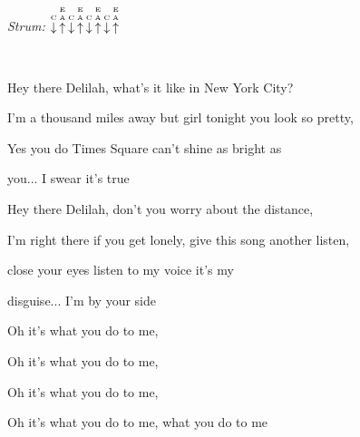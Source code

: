\begin{song}


 \quad
\textit{Strum:} $\PluckDown{C}\PluckUp{E A}\PluckDown{C}\PluckUp{E A}\PluckDown{C}\PluckUp{E A}\PluckDown{C}\PluckUp{E A}$

\large

\begin{chordbox}
\par
{}\par
{}\par
{}\par
{}\par
\end{chordbox}

\large

\bigskip

\Intro\     \par

\bigskip

 Hey there Delilah, what's it like in New York City? \par
I'm a thousand miles away but girl tonight you look so pretty, \par
Yes you do  Times Square can't shine as bright as \par
{}you... I swear it's true \par

\bigskip

 Hey there Delilah, don't you worry about the distance, \par
I'm right there if you get lonely, give this song another listen, \par
close your eyes listen to my voice it's my \par
disguise... I'm by your side \par

\bigskip

\begin{chorusbox}{\Chorus}
Oh it's what you do to me, \par
{}Oh it's what you do to me, \par
{}Oh it's what you do to me, \par
{}Oh it's what you do to me, what you  do to me \par
\end{chorusbox}


\end{song}
